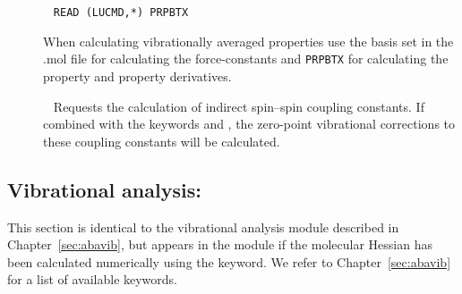 \begin{description}
\item[]\verb| |\newline
\verb|READ (LUCMD,*) PRPBTX|

When calculating vibrationally averaged properties use the basis set in the
.mol file for calculating the force-constants and \verb|PRPBTX| for
calculating the property and property derivatives.

\item[]\verb| |\newline
Requests the calculation of indirect spin--spin coupling constants.
If combined with the keywords  and , the
zero-point vibrational corrections to these coupling constants will be
calculated.

\end{description}

\subsection{Vibrational analysis: }
\label{sec:nmddrv.vibana}

This section is identical to the vibrational analysis module described
in Chapter~\ref{sec:abavib}, but appears in the  module
if the molecular Hessian has been calculated numerically using the 
keyword. We refer to Chapter~\ref{sec:abavib} for a list of available
keywords.
